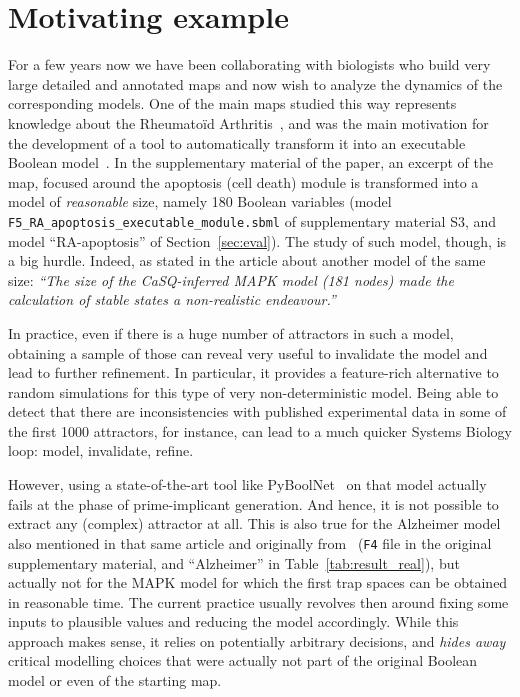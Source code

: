 \documentclass[runningheads]{llncs}
\begin{document}
\section{Motivating example}

For a few years now we have been collaborating with biologists who build very large detailed and annotated maps and now wish to analyze the dynamics of the corresponding models.
One of the main maps studied this way represents knowledge about the Rheumatoïd Arthritis~\cite{singh2018computational}, and was the main motivation for the development of a tool to automatically transform it into an executable Boolean model~\cite{aghamiri2020automated}.
In the supplementary material of the paper, an excerpt of the map, focused around the apoptosis (cell death) module is transformed into a model of \emph{reasonable} size, namely 180 Boolean variables (model \verb|F5_RA_apoptosis_executable_module.sbml| of supplementary material S3, and model ``RA-apoptosis'' of Section~\ref{sec:eval}).
The study of such model, though, is a big hurdle.
Indeed, as stated in the article about another model of the same size:
\emph{``The size of the CaSQ-inferred MAPK model (181 nodes) made the calculation of stable states a non-realistic endeavour.''}

In practice, even if there is a huge number of attractors in such a model, obtaining a sample of those can reveal very useful to invalidate the model and lead to further refinement.
In particular, it provides a feature-rich alternative to random simulations for this type of very non-deterministic model.
Being able to detect that there are inconsistencies with published experimental data in some of the first 1000 attractors, for instance, can lead to a much quicker Systems Biology loop: model, invalidate, refine.

However, using a state-of-the-art tool like PyBoolNet~\cite{klarner2015computing} on that model actually fails at the phase of prime-implicant generation.
And hence, it is not possible to extract any (complex) attractor at all.
This is also true for the Alzheimer model also mentioned in that same article and originally from~\cite{ogishima2016alzpathway} (\verb|F4| file in the original supplementary material, and ``Alzheimer'' in Table~\ref{tab:result_real}), but actually not for the MAPK model for which the first trap spaces can be obtained in reasonable time.
The current practice usually revolves then around fixing some inputs to plausible values and reducing the model accordingly.
While this approach makes sense, it relies on potentially arbitrary decisions, and \emph{hides away} critical modelling choices that were actually not part of the original Boolean model or even of the starting map.
\end{document}

